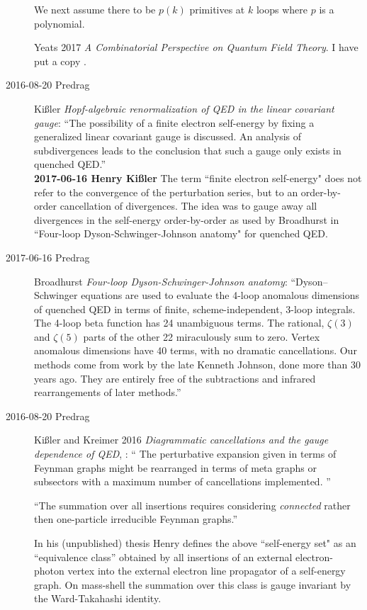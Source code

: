 \begin{description}
We next assume there to be $p(k)$ primitives at $k$ loops where $p$ is a
polynomial.

Yeats 2017 {\em {A Combinatorial Perspective on Quantum Field Theory}}.
I have put a copy .

\item[2016-08-20 Predrag]
Ki{\ss}ler
{\em Hopf-algebraic renormalization of QED in the linear covariant gauge}:
``The possibility of a finite electron self-energy by fixing a
generalized linear covariant gauge is discussed. An analysis of
subdivergences leads to the conclusion that such a gauge only exists in
quenched QED.''
\\{\bf 2017-06-16 Henry Ki{\ss}ler}
The term ``finite electron self-energy" does not refer to the convergence
of the perturbation series, but to an order-by-order cancellation of
divergences. The idea was to gauge away all divergences in the
self-energy order-by-order as used by Broadhurst in
``Four-loop Dyson-Schwinger-Johnson anatomy" for quenched QED.

\item[2017-06-16 Predrag]
Broadhurst {\em Four-loop Dyson-Schwinger-Johnson
anatomy}: ``Dyson–Schwinger equations are used to evaluate the 4-loop
anomalous dimensions of quenched QED in terms of finite,
scheme-independent, 3-loop integrals. The 4-loop beta function has 24
unambiguous terms. The rational, $\zeta(3)$ and $\zeta(5)$ parts of the
other 22 miraculously sum to zero. Vertex anomalous dimensions have 40
terms, with no dramatic cancellations. Our methods come from work by the
late Kenneth Johnson, done more than 30 years ago. They are entirely free
of the subtractions and infrared rearrangements of later methods.''

\item[2016-08-20 Predrag]
Ki{\ss}ler and Kreimer 2016
{\em Diagrammatic cancellations and the gauge dependence of {QED}},
 :
``
The perturbative expansion given in terms of Feynman graphs might be
rearranged in terms of meta graphs or subsectors with a maximum number of
cancellations implemented.
''

``The summation over all insertions requires considering \emph{connected}
rather then one-particle irreducible Feynman graphs.''

In his (unpublished) thesis Henry defines the above ``self-energy set" as
an ``equivalence class'' obtained by all insertions of an external
electron-photon vertex into the external electron line propagator of a
self-energy graph. On mass-shell the summation over this class is gauge
invariant by the Ward-Takahashi identity.


\end{description}
